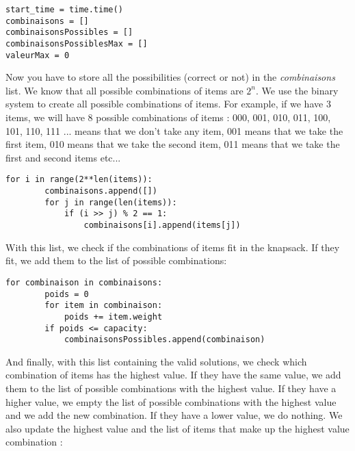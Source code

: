 \documentclass[12pt]{article}
\begin{document}
            \bigskip
            \begin{lstlisting}
start_time = time.time()
combinaisons = []
combinaisonsPossibles = []
combinaisonsPossiblesMax = []
valeurMax = 0
            \end{lstlisting}
            \bigskip
            
            Now you have to store all the possibilities (correct or not) in the \emph{combinaisons} list. We know that all possible combinations of items are $2^n$. We use the binary system to create all possible combinations of items. For example, if we have 3 items, we will have 8 possible combinations of items : 000, 001, 010, 011, 100, 101, 110, 111 ... means that we don't take any item, 001 means that we take the first item, 010 means that we take the second item, 011 means that we take the first and second items etc...

            \bigskip
            \begin{lstlisting}
for i in range(2**len(items)):
        combinaisons.append([])
        for j in range(len(items)):
            if (i >> j) % 2 == 1:
                combinaisons[i].append(items[j])
            \end{lstlisting}
            \bigskip
            
            With this list, we check if the combinations of items fit in the knapsack. If they fit, we add them to the list of possible combinations:

            \bigskip
            \begin{lstlisting}
for combinaison in combinaisons:
        poids = 0
        for item in combinaison:
            poids += item.weight
        if poids <= capacity:
            combinaisonsPossibles.append(combinaison)
            \end{lstlisting}
            \bigskip
            
            And finally, with this list containing the valid solutions, we check which combination of items has the highest value. If they have the same value, we add them to the list of possible combinations with the highest value. If they have a higher value, we empty the list of possible combinations with the highest value and we add the new combination. 
            \newpage
            If they have a lower value, we do nothing. We also update the highest value and the list of items that make up the highest value combination :
\end{document}
